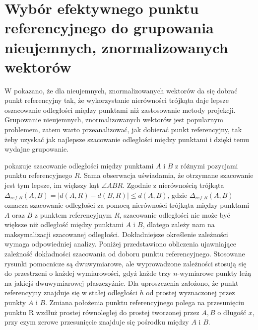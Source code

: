 \section{Wybór efektywnego punktu referencyjnego do grupowania nieujemnych, znormalizowanych wektorów}
W \cite{tivsp} pokazano, że dla nieujemnych, znormalizowanych wektorów da się dobrać punkt referencyjny tak, że wykorzystanie nierówności trójkąta daje lepsze oszacowanie odległości między punktami niż zastosowanie metody projekcji. Grupowanie nieujemnych, znormalizowanych wektorów jest popularnym problemem, zatem warto przeanalizować, jak dobierać punkt referencyjny, tak żeby uzyskać jak najlepsze szacowanie odległości między punktami i dzięki temu wydajne grupowanie.\par


 pokazuje szacowanie odległości między punktami $ A $ i $ B $ z różnymi pozycjami punktu referencyjnego $ R $. Sama obserwacja uświadamia, że otrzymane szacowanie jest tym lepsze, im większy kąt $ \angle{ABR} $. Zgodnie z nierównością trójkąta $ \Delta_{ref\_R}(A,B) = |d(A,R) - d(B,R)| \le d(A,B) $, gdzie $ \Delta_{ref\_R}(A,B) $ oznacza szacowanie odległości za pomocą nierówności trójkąta między punktami $ A $ oraz $ B $ z punktem referencyjnym $ R $, szacowanie odległości nie może być większe niż odległość między punktami $ A $ i $ B $, dlatego zależy nam na maksymalizacji szacowanej odległości. Dokładniejsze określenie zależności wymaga odpowiedniej analizy. Poniżej przedstawiono obliczenia ujawniające zależność dokładności szacowania od doboru punktu referencyjnego. Stosowane rysunki pomocnicze są dwuwymiarowe, ale wyprowadzone zależności stosują się do przestrzeni o każdej wymiarowości, gdyż każde trzy $ n $-wymiarowe punkty leżą na jakiejś dwuwymiarowej płaszczyźnie. Dla uproszczenia założono, że punkt referencyjny znajduje się w stałej odległości $ h $ od prostej wyznaczonej przez punkty $ A $ i $ B $. Zmiana położenia punktu referencyjnego polega na przesunięciu punktu R wzdłuż prostej równoległej do prostej tworzonej przez $ A, B $ o długość $ x $, przy czym zerowe przesunięcie znajduje się pośrodku między $ A $ i $ B $.\par



